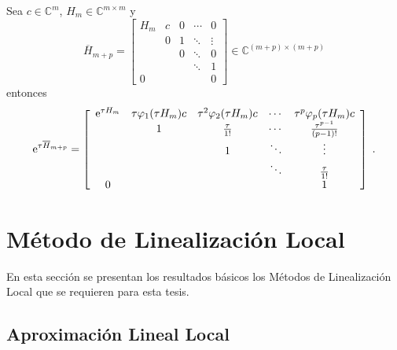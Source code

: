 \begin{theorem}\label{theorem:exp-phi}
    \cite{sidje1998expokit} Sea $c\in\mathbb{C}^{m}$, $H_m\in\mathbb{C}^{m\times m}$ y 
    \begin{equation}
    \overline{H}_{m+p} = \left[\begin{array}{ccccc}
    H_m & c & 0 & \cdots & 0 \\
          & 0 & 1 & \ddots & \vdots \\
          &   & 0 & \ddots & 0 \\
          &   &   & \ddots & 1 \\
       0  &   &   &        & 0
    \end{array}\right]\in \mathbb{C}^{(m+p)\times(m+p)}
    \end{equation}
    entonces
     \begin{equation}
    \mathrm{e}^{\tau\overline{H}_{m+p}} = \left[\begin{array}{ccccc}
    \mathrm{e}^{\tau H_m} & \tau\varphi_1(\tau H_m)c & \tau^{2}\varphi_2(\tau H_m)c & \cdots & \tau^{p}\varphi_p(\tau H_m)c \\
      & 1 & \frac{\tau}{1!} & \cdots & \frac{\tau^{p-1}}{(p-1)!} \\
      &   & 1 & \ddots & \vdots \\
      &   &   & \ddots & \frac{\tau}{1!} \\
    0 &   &   &        & 1
    \end{array}\right]  \;.
    \end{equation}
\end{theorem} 


\section{Método de Linealización Local}\label{section:ll-methods}
En esta sección se presentan los resultados básicos los Métodos de Linealización Local que se requieren para esta tesis.

\subsection{Aproximación Lineal Local}

